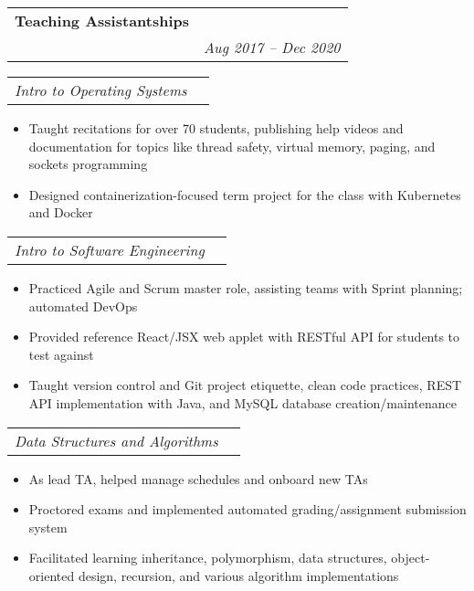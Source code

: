 \documentclass[letterpaper,11pt]{article}
\makeatletter
\newcommand{\resumeItem}[2]{
  \item\small{
    \textbf{#1}{#2 \vspace{-2pt}}
  }
}
\newcommand{\resumeSubheading}[4]{
  \vspace{-1pt}\item
    \begin{tabular*}{0.97\textwidth}[t]{l@{\extracolsep{\fill}}r}
      \textbf{#1} & #2 \\
      \textit{\small#3} & \textit{\small #4} \\
    \end{tabular*}\vspace{-5pt}
}
\newcommand{\resumeSubSubheading}[2]{
    \begin{tabular*}{0.97\textwidth}{l@{\extracolsep{\fill}}r}
      \textit{\small#1} & \textit{\small #2} \\
    \end{tabular*}\vspace{-5pt}
}
\newcommand{\resumeItemListStart}{\begin{itemize}}
\newcommand{\resumeItemListEnd}{\end{itemize}\vspace{-5pt}}
\makeatother
\begin{document}
    \resumeSubheading
      {Teaching Assistantships}{}{}{Aug 2017 -- Dec 2020}
      \resumeSubSubheading
        {Intro to Operating Systems}{}
        \resumeItemListStart
          \resumeItem{}
            {Taught recitations for over 70 students, publishing help videos and documentation for topics like thread safety, virtual memory, paging, and sockets programming}
          \resumeItem{}
            {Designed containerization-focused term project for the class with Kubernetes and Docker}
        \resumeItemListEnd
      \resumeSubSubheading
        {Intro to Software Engineering}{}
        \resumeItemListStart
          \resumeItem{}
            {Practiced Agile and Scrum master role, assisting teams with Sprint planning; automated DevOps}
          \resumeItem{}
            {Provided reference React/JSX web applet with RESTful API for students to test against}
          \resumeItem{}
            {Taught version control and Git project etiquette, clean code practices, REST API implementation with Java, and MySQL database creation/maintenance}
        \resumeItemListEnd
      \resumeSubSubheading
      {Data Structures and Algorithms}{}
      \resumeItemListStart
        \resumeItem{}
          {As lead TA, helped manage schedules and onboard new TAs}
        \resumeItem{}
          {Proctored exams and implemented automated grading/assignment submission system}
        \resumeItem{}
          {Facilitated learning inheritance, polymorphism, data structures, object-oriented design, recursion, and various algorithm implementations}
      \resumeItemListEnd


\end{document}
